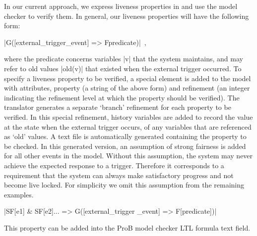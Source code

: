 In our current approach, we express liveness properties in \LTL  and use the 
\PROB model checker to verify them.
In general, our liveness properties will have the following form:
\begin{center}
  |G([external_trigger_event] => F{predicate})|~,
\end{center}
where the predicate concerns variables |v| that the system maintains, and may refer to old values |old(v)| that existed when the external trigger occurred.
To specify a liveness property to be verified, a special \LTL element is added to the \SCXML model with attributes, property (a string of the above form)  and refinement (an integer indicating the refinement level at which the property should be verified).
The translator generates a separate `branch' refinement for each \LTL property to be verified. 
In this special refinement, history variables are added to record the value at the state when the external trigger occurs, of any variables that are referenced as `old' values.
A text file is automatically generated containing the \LTL property to be checked. 
In this generated version, an assumption of strong fairness is added for all other events in the model.
Without this assumption, the system may never achieve the expected response to a trigger. 
Therefore it corresponds to a requirement that the system can always make satisfactory progress and not become live locked.
For simplicity we omit this assumption from the remaining examples.
\begin{center}
  |SF[e1] & SF[e2]... => G([external_trigger _event] => F[predicate])|
\end{center}
This property can be added into the ProB model checker LTL formula text field.

